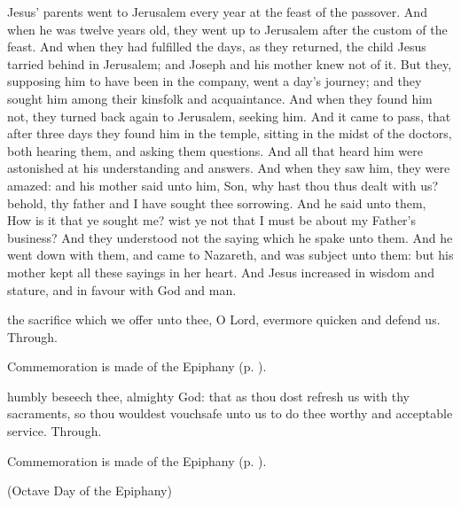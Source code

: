  Jesus' parents went to Jerusalem every year at the feast of the passover. And when he was twelve years old, they went up to Jerusalem after the custom of the feast. And when they had fulfilled the days, as they returned, the child Jesus tarried behind in Jerusalem; and Joseph and his mother knew not of it. But they, supposing him to have been in the company, went a day's journey; and they sought him among their kinsfolk and acquaintance. And when they found him not, they turned back again to Jerusalem, seeking him. And it came to pass, that after three days they found him in the temple, sitting in the midst of the doctors, both hearing them, and asking them questions. And all that heard him were astonished at his understanding and answers. And when they saw him, they were amazed: and his mother said unto him, Son, why hast thou thus dealt with us? behold, thy father and I have sought thee sorrowing. And he said unto them, How is it that ye sought me? wist ye not that I must be about my Father's business? And they understood not the saying which he spake unto them. And he went down with them, and came to Nazareth, and was subject unto them: but his mother kept all these sayings in her heart. And Jesus increased in wisdom and stature, and in favour with God and man.

\secret
{} the sacrifice which we offer unto thee, O Lord, evermore quicken and defend us. Through.
\begin{rubric}
    Commemoration is made of the Epiphany (p. \pageref{EpiphanyMassSecret}).
\end{rubric}
\postcommunion
{} humbly beseech thee, almighty God: that as thou dost refresh us with thy sacraments, so thou wouldest vouchsafe unto us to do thee worthy and acceptable service. Through.
\begin{rubric}
    Commemoration is made of the Epiphany (p. \pageref{EpiphanyMassPostcommunion}).
\end{rubric}


\centerline{\small{(Octave Day of the Epiphany)}}

